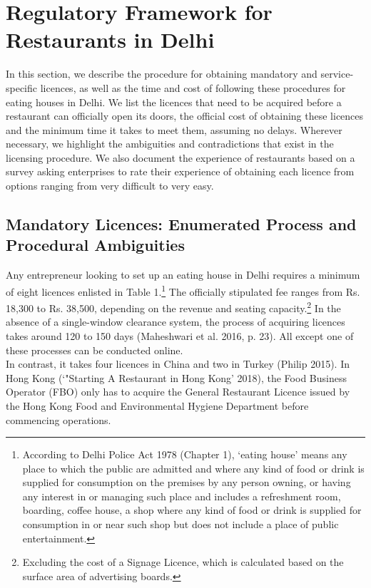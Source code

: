 \documentclass[a4paper, 12pt]{article}
\begin{document}
                    \section{Regulatory Framework for Restaurants in Delhi}
                    \label{sec:1}
                    In this section, we describe the procedure for obtaining mandatory and service-specific licences, as well as the time and cost of following these procedures for eating houses in Delhi. We list the licences that need to be acquired before a restaurant can officially open its doors, the official cost of obtaining these licences and the minimum time it takes to meet them, assuming no delays. Wherever necessary, we highlight the ambiguities and contradictions that exist in the licensing procedure. We also document the experience of restaurants based on a survey asking enterprises to rate their experience of obtaining each licence from options ranging from very difficult to very easy.
                    
                    
                    \subsection{Mandatory Licences: Enumerated Process and Procedural Ambiguities}
                     Any entrepreneur looking to set up an eating house in Delhi requires a minimum of eight licences enlisted in Table 1.\footnote{According to Delhi Police Act 1978 (Chapter 1), ‘eating house’ means any place to which the public are admitted and where any kind of food or drink is supplied for consumption on the premises by any person owning, or having any interest in or managing such place and includes a refreshment room, boarding, coffee house, a shop where any kind of food or drink is supplied for consumption in or near such shop but does not include a place of public entertainment.} The officially stipulated fee ranges from Rs. 18,300 to Rs. 38,500, depending on the revenue and seating capacity.\footnote{Excluding the cost of a Signage Licence, which is calculated based on the surface area of advertising boards.} In the absence of a single-window clearance system, the process of acquiring licences takes around 120 to 150 days (Maheshwari et al. 2016, p. 23). All except one of these processes can be conducted online.\\
                   In contrast, it takes four licences in China and two in Turkey (Philip 2015). In Hong Kong (‘"Starting A Restaurant in Hong Kong’ 2018), the Food Business Operator (FBO) only has to acquire the General Restaurant Licence issued by the Hong Kong Food and Environmental Hygiene Department before commencing operations.
                    
\end{document}
